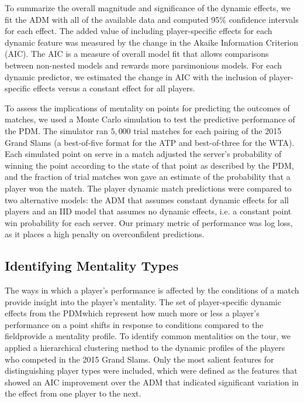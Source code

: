 \documentclass{Latex/svjour3}
\begin{document}
To summarize the overall magnitude and significance of the dynamic effects, we
fit the ADM with all of the available data and computed 95\% confidence
intervals for each effect. The added value of including player-specific effects
for each dynamic feature was measured by the change in the Akaike Information
Criterion (AIC). The AIC is a measure of overall model fit that allows
comparisons between non-nested models and rewards more parsimonious models. For
each dynamic predictor, we estimated the change in AIC with the inclusion of
player-specific effects versus a constant effect for all players.

To assess the implications of mentality on points for predicting the outcomes of
matches, we used a Monte Carlo simulation to test the predictive performance of
the PDM. The simulator ran $5,000$ trial matches for each pairing of the 2015
Grand Slams (a best-of-five format for the ATP and best-of-three for the
WTA). Each simulated point on serve in a match adjusted the server's probability
of winning the point according to the state of that point as described by the
PDM, and the fraction of trial matches won gave an estimate of the probability
that a player won the match. The player dynamic match predictions were compared
to two alternative models: the ADM that assumes constant dynamic effects for all
players and an IID model that assumes no dynamic effects, i.e. a constant point
win probability for each server. Our primary metric of performance was log loss,
as it places a high penalty on overconfident predictions\cite{yuan2015mixture}.


\subsection{Identifying Mentality Types}

The ways in which a player's performance is affected by the conditions of a
match provide insight into the player's mentality. The set of player-specific
dynamic effects from the PDM\textemdash which represent how much more or less a
player's performance on a point shifts in response to conditions compared to the
field\textemdash provide a mentality profile. To identify common mentalities on
the tour, we applied a hierarchical clustering method to the dynamic profiles of
the players who competed in the 2015 Grand Slams. Only the most salient features
for distinguishing player types were included, which were defined as the
features that showed an AIC improvement over the ADM that indicated significant
variation in the effect from one player to the next.
\end{document}
